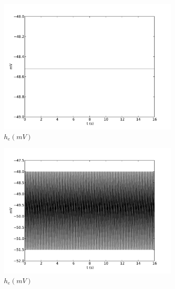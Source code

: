 \documentclass[a4paper,12pt]{article}
\begin{document}
\begin{figure}
	\begin{subfigure}[b]{0.5\textwidth}
		\includegraphics[scale=0.35]{frontiers-2012-images-revised/effect_gamma_ee_yml-00493_ode-burst-psp-res_yml-mod-res-5-1-1-1_yml-he-intra.pdf}
		\caption{$h_e (mV)$}
	\end{subfigure}
	\begin{subfigure}[b]{0.5\textwidth}
		\includegraphics[scale=0.35]{frontiers-2012-images-revised/effect_gamma_ee_yml-00493_ode-burst-psp-res_yml-mod-res-3-1-1-1_yml-he-intra.pdf}
		\caption{$h_e (mV)$}
	\end{subfigure}
	\begin{subfigure}[b]{0.5\textwidth}

\end{subfigure}
\end{figure}
\end{document}
